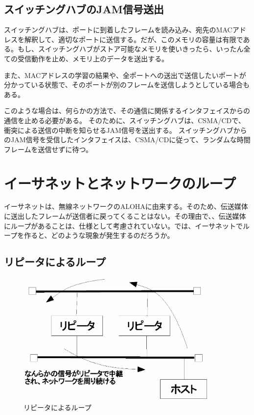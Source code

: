 \subsection{スイッチングハブのJAM信号送出}

スイッチングハブは、ポートに到着したフレームを読み込み、宛先のMACアドレスを解釈して、適切なポートに送信する。だが、このメモリの容量は有限である。もし、スイッチングハブがストア可能なメモリを使いきったら、いったん全ての受信動作を止め、メモリ上のデータを送出する。

また、MACアドレスの学習の結果や、全ポートへの送出で送信したいポートが分かっている状態で、そのポートが別のフレームを送信しようとしている場合もある。

このような場合は、何らかの方法で、その通信に関係するインタフェイスからの通信を止める必要がある。
そのために、スイッチングハブは、CSMA/CDで、衝突による送信の中断を知らせるJAM信号を送出する。
スイッチングハブからのJAM信号を受信したインタフェイスは、CSMA/CDに従って、ランダムな時間フレームを送信せずに待つ。

\section{イーサネットとネットワークのループ}

イーサネットは、無線ネットワークのALOHAに由来する。そのため、伝送媒体に送出したフレームが送信者に戻ってくることはない。その理由で、、伝送媒体にループがあることは、仕様として考慮されていない。では、イーサネットでループを作ると、どのような現象が発生するのだろうか。


\subsection{リピータによるループ}


\begin{figure}[htbp]
	\includegraphics[width=10cm,clip]{draw/repeaterloop.eps}
	\caption{リピータによるループ}
	\label{fig:repeaterloop}
\end{figure}

